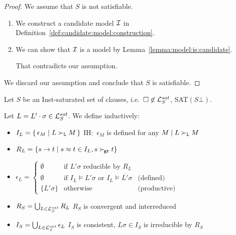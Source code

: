        \begin{proof} We assume that \( S \) is not satisfiable.
           \begin{enumerate}
               \item We construct a candidate model \( \mathcal{I} \) in Definition~\vref{def:candidate:model:construction}.
               \item We can show that \( \mathcal{I} \) is a model by Lemma~\vref{lemma:model:is:candidate}.

                That contradicts our assumption.
           \end{enumerate}
            We discard our assumption and conclude that \( S \) is satisfiable.
           \end{proof}

   \begin{definition}\label{def:candidate:model:construction}

        Let \( S \) be an Inst-saturated set of clauses,
        i.e.~\( \square\not\in\mathcal{L}_S^{sat} \), SAT\( (S\bot) \).

        Let \( L = L'\cdot\sigma \in\mathcal{L}_S^{sat} \).
        We define inductively:

           \begin{itemize}
               \item \( I_L = \{ \, \epsilon_M\mid L\mathrel\succ_{\mathtt{L}} M \, \} \)
               \hfill  IH:~\( \epsilon_M \) is defined for any \( M\mid L\mathrel\succ_{\mathtt{L}} M \)

               \item \( R_L = \{ s \to t \mid s\approx t\in I_L, s\mathrel\succ_{\!\mathtt{gr}} t \} \)

                   \item \( \epsilon_L = \left \{
                       \begin{array}{cll}
                           \emptyset &\text{if }
                            L'\sigma\text{ reducible by }R_L
                           \\
                           \emptyset &\text{if }
                            I_L\vDash L'\sigma
                           \text{ or }
                            I_L\vDash \overline{L'}\sigma
                            &\text{(defined)}
                           \\
                           \{ L'\sigma \}
                            &\text{otherwise}
                            &\text{(productive)}
                       \end{array}
                   \right. \)

               \item
               \( R_S = \bigcup_{L\in\mathcal{L}_S^{sat}} R_L \)
               \hfill
               \( R_S \) is convergent and interreduced

               \item
               \( I_S = \bigcup_{L\in\mathcal{L}_S^{sat}} \epsilon_L \)
               \hfill
               \( I_S \) is consistent,
               \( L\sigma\in I_S \) is irreducible by \( R_S \)
           \end{itemize}
       \end{definition}


